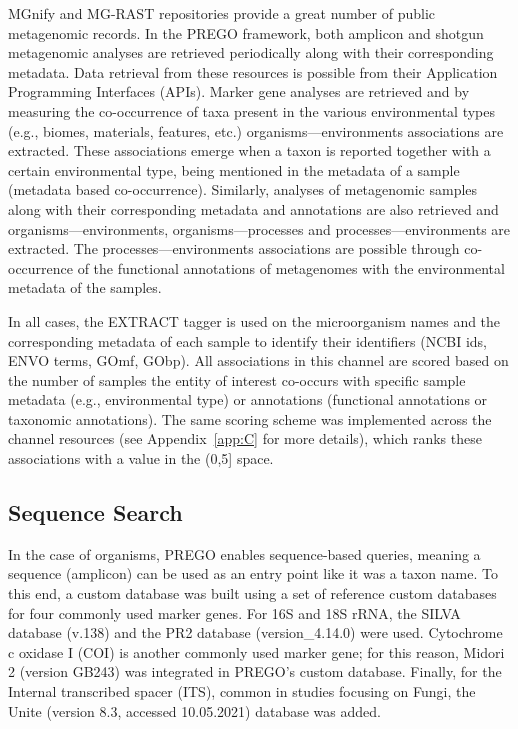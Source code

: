    MGnify \parencite{mitchell2020mgnify} and MG-RAST \parencite{wilke2015restful} repositories provide a great number of public metagenomic records. 
   In the PREGO framework, both amplicon and shotgun metagenomic analyses are retrieved periodically along with their corresponding metadata. 
   Data retrieval from these resources is possible from their Application Programming Interfaces (APIs). Marker gene analyses are retrieved and by measuring
   the co-occurrence of taxa present in the various environmental types (e.g., biomes, materials, features, etc.) organisms—environments associations are extracted. 
   These associations emerge when a taxon is reported together with a certain environmental type, being mentioned in the metadata of a sample (metadata based co-occurrence). 
   Similarly, analyses of metagenomic samples along with their corresponding metadata and annotations are also retrieved and organisms—environments, organisms—processes and processes—environments are extracted. 
   The processes—environments associations are possible through co-occurrence of the functional annotations of metagenomes with the environmental metadata of the samples.
   
   In all cases, the EXTRACT tagger is used on the microorganism names and the corresponding metadata of each sample to identify their identifiers (NCBI ids, ENVO terms, GOmf, GObp). 
   All associations in this channel are scored based on the number of samples the entity of interest co-occurs with specific sample metadata (e.g., environmental type) or annotations (functional annotations or taxonomic annotations). 
   The same scoring scheme was implemented across the channel resources (see Appendix~\ref{app:C} for more details), which ranks these associations with a value in the (0,5] space.


   \subsection{Sequence Search}
   \label{subsec:prego-seq-search}

   In the case of organisms, PREGO enables sequence-based queries, meaning a sequence (amplicon) can be used as an entry point like it was a taxon name. 
   To this end, a custom database was built using a set of reference custom databases for four commonly used marker genes. For 16S and 18S rRNA, the SILVA database (v.138) \parencite{quast_silva_2013} and the PR2 database (version\_4.14.0) \parencite{guillou2012protist, del2018eukref} were used. 
   Cytochrome c oxidase I (COI) \parencite{suter2021capturing} is another commonly used marker gene; 
   for this reason, Midori 2 (version GB243) \parencite{leray2018midori} was integrated in PREGO's custom database. 
   Finally, for the Internal transcribed spacer (ITS), common in studies focusing on Fungi, the Unite (version 8.3, accessed 10.05.2021) \parencite{nilsson2019unite} database was added.



